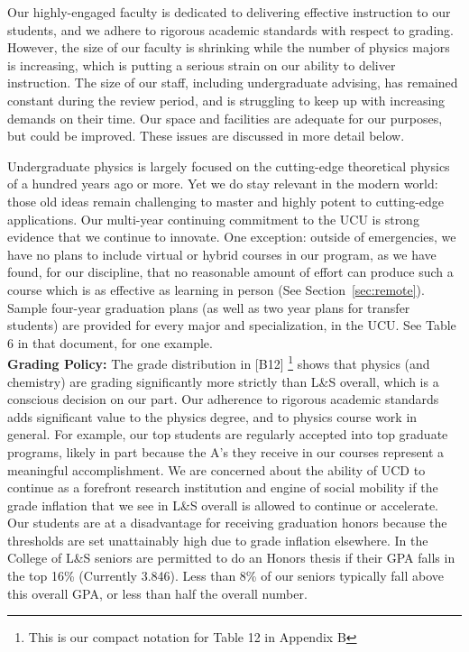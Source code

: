 \documentclass[12pt]{article}
\begin{document}
\noindent
Our highly-engaged faculty is dedicated to delivering effective instruction to our students, and we adhere to rigorous academic standards with respect to grading.  However, the size of our faculty is shrinking while the number of physics majors is increasing, which is putting a serious strain on our ability to deliver instruction.  The size of our staff, including undergraduate advising, has remained constant during the review period, and is struggling to keep up with increasing demands on their time.  Our space and facilities are adequate for our purposes, but could be improved.  These issues are discussed in more detail below.

Undergraduate physics is largely focused on the
cutting-edge theoretical physics of a hundred years ago or more.  Yet
we do stay relevant in the modern world: those old ideas remain
challenging to master and highly potent to cutting-edge applications.
Our multi-year continuing commitment to the UCU is strong evidence
that we continue to innovate.  One exception: outside of emergencies,
we have no plans to include virtual or hybrid courses in our program,
as we have found, for our discipline, that no reasonable amount of
effort can produce such a course which is as effective as learning in
person (See Section~\ref{sec:remote}).  Sample four-year graduation
plans (as well as two year plans for transfer students) are provided
for every major and specialization, in the UCU.  See Table 6 in that
document, for one example.\\[3pt]

\noindent
{\bf Grading Policy:} The grade distribution in [B12]
\footnote{This is our compact notation for Table 12 in Appendix B}
shows that physics (and chemistry) are grading significantly more strictly than
L\&S overall, which is a conscious decision on our part.  Our
adherence to rigorous academic standards adds significant value to the
physics degree, and to physics course work in general.  For example,
our top students are regularly accepted into top graduate programs,
likely in part because the A's they receive in our courses represent a
meaningful accomplishment.  We are concerned about the ability of UCD
to continue as a forefront research institution and engine of social
mobility if the grade inflation that we see in L\&S overall is allowed
to continue or accelerate.  Our students are at a disadvantage for
receiving graduation honors because the thresholds are set
unattainably high due to grade inflation elsewhere.  In the College of
L\&S seniors are permitted to do an Honors thesis if their GPA falls
in the top 16\% (Currently 3.846).  Less than 8\% of our seniors
typically fall above this overall GPA, or less than half the overall
number.\\[3pt]
\end{document}
